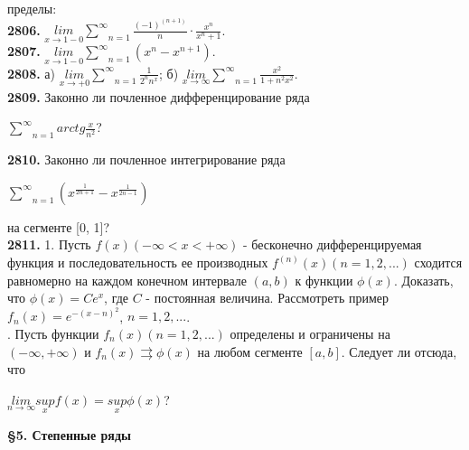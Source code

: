 \documentclass{book}
\begin{document}
 пределы:\\
    \quad\textbf{2806.} \(\underset{x \rightarrow 1 - 0}{lim} \underset{n = 1}{\overset{\infty}{\sum}}\frac{(-1)^{(n+1)}}{n} \cdot \frac{x^n}{x^n + 1}\).\\
    \quad\textbf{2807.} \(\underset{x \rightarrow 1 - 0}{lim} \underset{n = 1}{\overset{\infty}{\sum}}(x^n - x^{n+1})\).\\
    \quad\textbf{2808.} а) \(\underset{x \rightarrow +0}{lim} \underset{n = 1}{\overset{\infty}{\sum}}\frac{1}{2^nn^x}\);
    б) \(\underset{x \rightarrow \infty}{lim} \underset{n = 1}{\overset{\infty}{\sum}}\frac{x^2}{1 + n^2x^2}\).\\

\singlespacing
\quad\textbf{2809.} Законно ли почленное дифференцирование ряда \\
\begin{center}
    \(\underset{n = 1}{\overset{\infty}{\sum}}arctg\frac{x}{n^2}\)?\\    
\end{center}
\quad\textbf{2810.} Законно ли почленное интегрирование ряда\\
\begin{center}
    \(\underset{n = 1}{\overset{\infty}{\sum}} \left(x^{\frac{1}{2n+1}} - x^{\frac{1}{2n-1}} \right)\)\\    
\end{center}
на сегменте [0, 1]?\\
\textbf{2811.} 1. Пусть \(f(x) (-\infty < x < +\infty)\) - бесконечно дифференцируемая функция и последовательность ее производных \(f^{(n)}(x)(n = 1, 2, ...)\) сходится равномерно на каждом конечном интервале \((a, b)\) к функции \(\phi(x)\). Доказать, что \(\phi(x) = Ce^x\), где \(C\) - постоянная величина. 
Рассмотреть пример \(f_n(x) = e^{-(x-n)^2}\), \(n = 1, 2, ...\).\\
. Пусть функции \(f_n(x)(n = 1, 2, ...)\) определены и ограничены на \((-\infty, +\infty)\) и \(f_n(x) \rightrightarrows \phi(x)\) на любом сегменте \([a, b]\). Следует ли отсюда, что\\
\begin{center}
    \(\underset{n \rightarrow \infty}{lim} \underset{x}{sup}f(x) = \underset{x}{sup}\phi(x)\)?
\end{center}

\begin{doublespace}
    \centering \textbf{ \large \S 5. Степенные ряды}\\
\end{doublespace}
\end{document}
